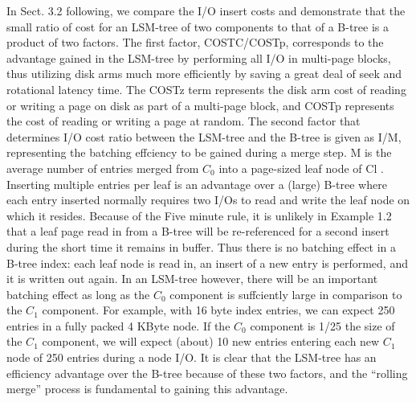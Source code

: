 \documentclass[a4paper,12pt,notitlepage,twoside,openright]{article}
\begin{document}
In Sect. 3.2 following, we compare the I/O insert costs and demonstrate
that the small ratio of cost for an LSM-tree of two components to that
of a B-tree is a product of two factors. The first factor, COSTC/COSTp,
corresponds to the advantage gained in the LSM-tree by performing all
I/O in multi-page blocks, thus utilizing disk arms much more efficiently
by saving a great deal of seek and rotational latency time. The COSTz
term represents the disk arm cost of reading or writing a page on disk
as part of a multi-page block, and COSTp represents the cost of reading
or writing a page at random. The second factor that determines I/O cost
ratio between the LSM-tree and the B-tree is given as I/M, representing
the batching effciency to be gained during a merge step. M is the
average number of entries merged from \(C_0\) into a page-sized leaf node of
Cl . Inserting multiple entries per leaf is an advantage over a (large)
B-tree where each entry inserted normally requires two I/Os to read and
write the leaf node on which it resides. Because of the Five minute
rule, it is unlikely in Example 1.2 that a leaf page read in from a
B-tree will be re-referenced for a second insert during the short time
it remains in buffer. Thus there is no batching effect in a B-tree
index: each leaf node is read in, an insert of a new entry is performed,
and it is written out again. In an LSM-tree however, there will be an
important batching effect as long as the \(C_0\) component is suffciently
large in comparison to the \(C_1\) component. For example, with 16 byte index
entries, we can expect 250 entries in a fully packed 4 KByte node. If
the \(C_0\) component is 1/25 the size of the \(C_1\) component, we will expect
(about) 10 new entries entering each new \(C_1\) node of 250 entries during a
node I/O. It is clear that the LSM-tree has an efficiency advantage over
the B-tree because of these two factors, and the ``rolling merge'' process
is fundamental to gaining this advantage.
\end{document}
